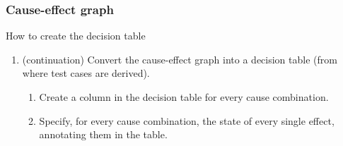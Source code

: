 \begin{frame}
\frametitle{Cause-effect graph}

\begin{block:procedure}{How to create the decision table}
\begin{enumerate}
	\item (continuation) Convert the cause-effect graph into a decision table
	(from where test cases are derived).
	\begin{enumerate}
		\item Create a column in the decision table for every cause
		combination.

		\item Specify, for every cause combination, the state of every single
		effect, annotating them in the table.
	\end{enumerate}
\end{enumerate}
\end{block:procedure}
\end{frame}


%

